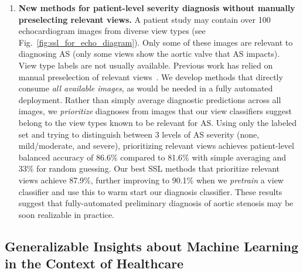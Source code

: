\begin{enumerate}[leftmargin=0cm,itemindent=.4cm,labelwidth=\itemindent,labelsep=0cm,align=left]
	\item \textbf{New methods for patient-level severity diagnosis without manually preselecting relevant views.}
	A patient study may contain over 100 echocardiogram images from diverse view types (see Fig.~\ref{fig:ssl_for_echo_diagram}).
	Only some of these images are relevant to diagnosing AS (only some views show the aortic valve that AS impacts).
	View type labels are not usually available.
	Previous work has relied on manual preselection of relevant views~\citep{madaniDeepEchocardiographyDataefficient2018,ouyangVideobasedAIBeattobeat2020}.
	We develop methods that directly consume \emph{all available images}, as would be needed in a fully automated deployment.	
	Rather than simply average diagnostic predictions across all images, we \emph{prioritize} diagnoses from images that our view classifiers suggest belong to the view types known to be relevant for AS.
	Using only the labeled set and trying to distinguish between 3 levels of AS severity (none, mild/moderate, and severe), prioritizing relevant views achieves patient-level balanced accuracy of 86.6\% compared to 81.6\% with simple averaging and 33\% for random guessing.
	Our best SSL methods that prioritize relevant views achieve 87.9\%, further improving to 90.1\% when we \emph{pretrain} a view classifier and use this to warm start our diagnosis classifier.
	These results suggest that fully-automated preliminary diagnosis of aortic stenosis may be soon realizable in practice.

\end{enumerate}

\subsection*{Generalizable Insights about Machine Learning in the Context of Healthcare}

